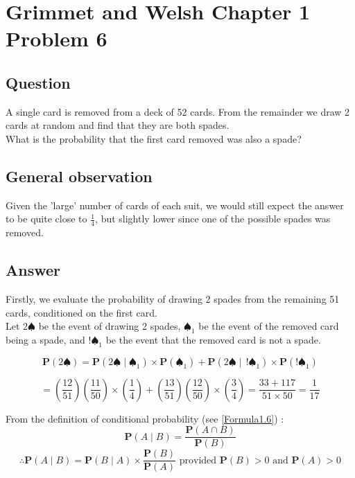 \section{Grimmet and Welsh Chapter 1 Problem 6}
\subsection{Question}


A single card is removed from a deck of 52 cards. From the remainder we draw 2 cards at random and find that they are both spades. \\
What is the probability that the first card removed was also a spade?

\subsection{General observation}
Given the 'large' number of cards of each suit, we would still expect the answer to be quite close to $\frac{1}{4}$, but slightly lower since one of the possible spades was removed.

\subsection{Answer}
Firstly, we evaluate the probability of drawing 2 spades from the remaining 51 cards, conditioned on the first card. \\
Let $2 \spadesuit$ be the event of drawing 2 spades, $\spadesuit_1$ be the event of the removed card being a spade, and $  !\spadesuit_1$ be the event that the removed card is not a spade. 

\begin{equation*} 
\mathbf{P}(2 \spadesuit)  = \mathbf{P}(2 \spadesuit \mid \spadesuit_1)\times  \mathbf{P}(\spadesuit_1) + 
\mathbf{P}(2 \spadesuit \mid \, !\spadesuit_1)\times  \mathbf{P}(!\spadesuit_1) 
\end{equation*} 
  
\begin{equation*} 
= \left(\frac{12}{51}\right)\left(\frac{11}{50}\right)\times\left(\frac{1}{4}\right) + \left(\frac{13}{51}\right) \left(\frac{12}{50}\right)\times\left(\frac{3}{4}\right)
= \frac{33 + 117}{51\times 50} = \frac{1}{17}
\end{equation*} 

From the definition of conditional probability (see \eqref{Formula1.6}) : 
\begin{equation*} 
\mathbf{P} (A \mid B) = \frac{\mathbf{P}(A \cap B)} {\mathbf{P}(B)}  
\end{equation*} 
\begin{equation*} 
\therefore \mathbf{P} (A \mid B) = \mathbf{P} (B \mid A) \times \frac{\mathbf{P}(B)}{\mathbf{P}(A)} \text{   provided } \mathbf{P}(B) > 0 \text{ and } \mathbf{P}(A) > 0
\end{equation*} 

